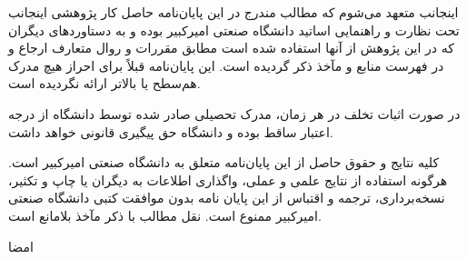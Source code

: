 \vspace*{2.5cm}

اينجانب {\bf{\fname\lname}} متعهد می‌شوم که مطالب مندرج در این پایان‌نامه حاصل کار پژوهشی اینجانب تحت نظارت و راهنمایی اساتید دانشگاه صنعتی امیرکبیر بوده و به دستاوردهای دیگران که در این پژوهش از آنها استفاده شده است مطابق مقررات و روال متعارف ارجاع و در فهرست منابع و مآخذ ذکر گردیده است. این پایان‌نامه قبلاً برای احراز هیچ مدرک هم‌سطح یا بالاتر ارائه نگردیده است.

در صورت اثبات تخلف در هر زمان، مدرک تحصیلی صادر شده توسط دانشگاه از درجه اعتبار ساقط بوده و دانشگاه حق پیگیری قانونی خواهد داشت.


کلیه نتایج و حقوق حاصل از این پایان‌نامه متعلق به دانشگاه صنعتی امیرکبیر است. هرگونه استفاده از نتایج علمی و عملی، واگذاری اطلاعات به دیگران یا چاپ و تکثیر، نسخه‌برداری، ترجمه و اقتباس از این پایان نامه بدون موافقت کتبی دانشگاه صنعتی امیرکبیر ممنوع است. 
نقل مطالب با ذکر مآخذ بلامانع است.\\
\vspace{2.5cm}


{\centerline {\bf{\fname\lname}}}
\vspace*{.2cm}
{\centerline{امضا}}
